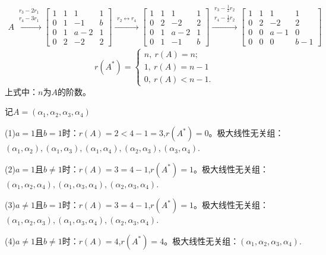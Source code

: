 \documentclass{article}
\begin{document}
\begin{jie}
\begin{align*}
A\xrightarrow{\substack{r_{3}-2 r_{1}\\ r_4-3r_1}}
{
\begin{bmatrix}
 1 & 1 & 1 & 1\\
  0 & 1 & -1& b\\
  0 & 1& a-2 & 1\\
  0 & 2 &-2 &2
\end{bmatrix}
}\xrightarrow{\substack{r_{2}\leftrightarrow r_4}}
{
\begin{bmatrix}
 1 & 1 & 1 & 1\\
  0 & 2 &-2 &2\\
  0 & 1& a-2 & 1\\
  0 & 1 & -1& b
\end{bmatrix}
}\xrightarrow{\substack{r_{3}-\frac{1}{2} r_2 \\r_{4}-\frac{1}{2} r_2}}
{
\begin{bmatrix}
 1 & 1 & 1 & 1\\
  0 & 2 &-2 &2\\
  0 & 0& a-1 & 0\\
  0 & 0 & 0& b-1
\end{bmatrix}
}
\end{align*}
\begin{equation*}
r(A^*)=
\begin{cases}
n,~r(A)=n;\\
1,~r(A)=n-1\\
0,~r(A)<n-1.
\end{cases}
\end{equation*}
上式中：$n$为$A$的阶数。

记$A=(\alpha_1,\alpha_2,\alpha_3,\alpha_4)$

(1)$a=1$且$b=1$时：$r(A)=2<4-1=3$,$r(A^*)=0$。极大线性无关组：$(\alpha_1,\alpha_2),(\alpha_1,\alpha_3),(\alpha_1,\alpha_4),(\alpha_2,\alpha_3),(\alpha_3,\alpha_4)$.

(2)$a=1$且$b\neq1$时：$r(A)=3=4-1$,$r(A^*)=1$。极大线性无关组：$(\alpha_1,\alpha_2,\alpha_4),(\alpha_1,\alpha_3,\alpha_4),(\alpha_2,\alpha_3,\alpha_4)$.

(3)$a\neq1$且$b=1$时：$r(A)=3=4-1$,$r(A^*)=1$。极大线性无关组：$(\alpha_1,\alpha_2,\alpha_3),(\alpha_1,\alpha_3,\alpha_4),(\alpha_2,\alpha_3,\alpha_4)$.

(4)$a\neq1$且$b\neq1$时：$r(A)=4$,$r(A^*)=4$。极大线性无关组：$(\alpha_1,\alpha_2,\alpha_3,\alpha_4)$.
\end{jie}
\end{document}

